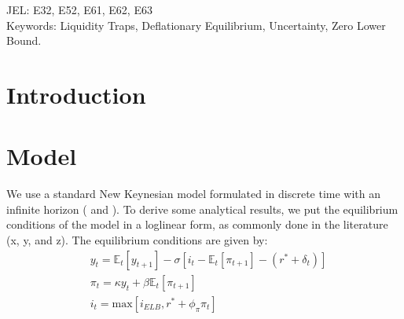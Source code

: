 \documentclass[11pt]{article}
\begin{document}
	\vspace{5em}
	
	\noindent JEL: E32, E52, E61, E62, E63\\
	
	\noindent Keywords: Liquidity Traps, Deflationary Equilibrium, Uncertainty, Zero Lower Bound.
	
	\newpage
	
	\section{Introduction}
	\label{S:Introduction}
	
	
	\section{Model}
	\label{S:Model}
	
	We use a standard New Keynesian model formulated in discrete time with an infinite horizon (\citet{Woodford2003Book} and \citet{Gali2015Book}). To derive some analytical results, we put the equilibrium conditions of the model in a loglinear form, as commonly done in the literature (x, y,  and z). The equilibrium conditions are given by: 
	\begin{align}
	& y_{t} = \mathbb{E}_t[y_{t+1}] - \sigma\left[i_t - \mathbb{E}_t[\pi_{t+1}]-  (r^* + \delta_t)\right] \label{eq:EE}\\
	& \pi_{t} = \kappa y_t + \beta\mathbb{E}_t[\pi_{t+1}]\label{eq:PC}\\
	& i_t = \text{max}\left[i_{ELB},r^* + \phi_{\pi}\pi_t\right]\label{eq:TR}
	\end{align}
	
\end{document}
